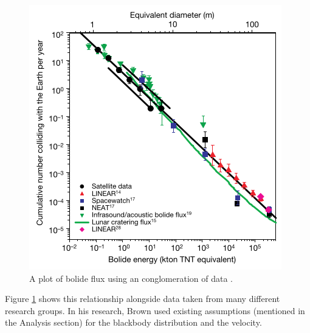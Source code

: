 \begin{figure}[ht!]
  \centering
  \includegraphics[scale=0.7]{images/flux_brown.png}
  \caption{A plot of bolide flux using an conglomeration of data \cite{brown_p_flux_2002}.}
  \label{powerlaw}
\end{figure}


Figure \ref{powerlaw} shows this relationship alongside data taken from many different research groups.  
In his research, Brown used existing assumptions (mentioned in the Analysis section) for the blackbody distribution and the velocity.  



